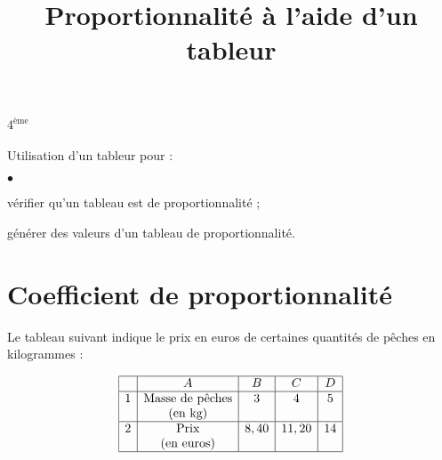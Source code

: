 \documentclass{article}
\title{Proportionnalité à l'aide d'un tableur}
\author{}
\date{}
\begin{document}
\maketitle

 $4^{\textrm{ème}}$  \\

  \\

\noindent Utilisation d'un tableur pour : 
\begin{list}{$\bullet$}{}
\item vérifier qu'un tableau est de proportionnalité ;
\item générer des valeurs d'un tableau de proportionnalité.
\end{list}




\section{Coefficient de proportionnalité}





Le tableau suivant indique le prix en euros de certaines quantités de pêches en kilogrammes :

\begin{equation*}
  \begin{array}{|c|c|c|c|c|}
    \hline
    & A & B & C & D \\
    \hline
    1 & \textrm{Masse de pêches} & 3 & 4 & 5 \\
    & \textrm{(en kg)} & & & \\
    \hline
    2 & \textrm{Prix} & 8,40 & 11,20 & 14 \\
    & \textrm{(en euros)} & & & \\
    \hline
  \end{array}
\end{equation*}
\end{document}
